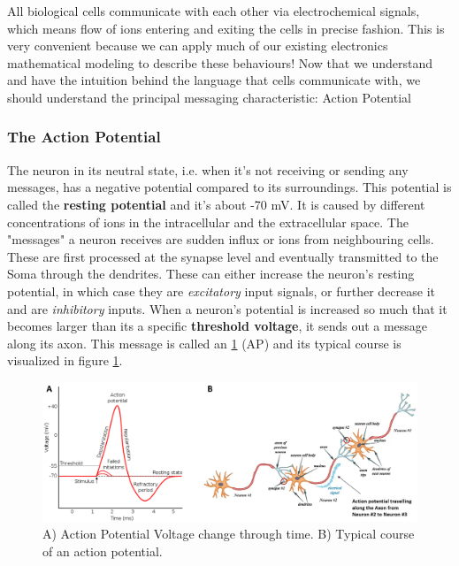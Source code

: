 All biological cells communicate with each other via electrochemical signals, which means flow of ions entering and exiting the cells in precise fashion. This is very convenient because we can apply much of our existing electronics mathematical modeling to describe these behaviours! Now that we understand and have the intuition behind the language that cells communicate with, we should understand the principal messaging characteristic: Action Potential

\subsubsection{The Action Potential}

The neuron in its neutral state, i.e. when it's not receiving or sending any messages, has a negative potential compared to its surroundings. This potential is called the \textbf{resting potential} and it's about -70 mV. It is caused by different concentrations of ions in the intracellular and the extracellular space. The "messages" a neuron receives are sudden influx or ions from neighbouring cells. These are first processed at the synapse level and eventually transmitted to the Soma through the dendrites. These can either increase the neuron's resting potential, in which case they are \textit{excitatory} input signals, or further decrease it and are \textit{inhibitory} inputs. When a neuron's potential is increased so much that it becomes larger than its a specific \textbf{threshold voltage}, it sends out a message along its axon. This message is called an \ref{fig:action_potential} (AP) and its typical course is visualized in figure \ref{fig:action_potential}. 

\begin{figure}
    \centering
    \includegraphics[width=1\linewidth]{Figures/Action_Potential_In_Full.PNG}
    \caption{A) Action Potential Voltage change through time. B) Typical course of an action potential.}
    \label{fig:action_potential}
\end{figure}


